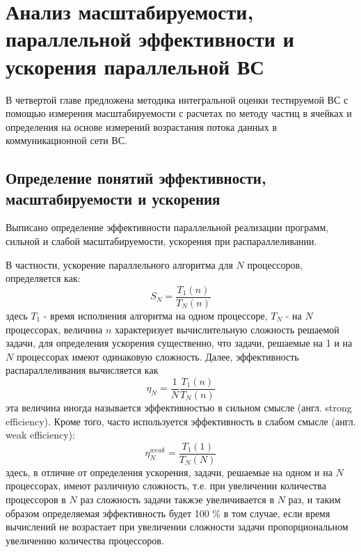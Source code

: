 \chapter{Анализ масштабируемости, параллельной эффективности и ускорения параллельной ВС}
				В четвертой главе предложена методика интегральной оценки тестируемой ВС с помощью измерения масштабируемости с расчетах по методу частиц в ячейках и определения на основе измерений возрастания потока данных в коммуникационной сети ВС.
							
			\section{Определение понятий эффективности, масштабируемости и ускорения}
			
			Выписано определение эффективности параллельной реализации программ, сильной и слабой масштабируемости, ускорения при распараллеливании.
			
			В частности, ускорение параллельного алгоритма для $N$ процессоров, определяется как:
			$$
			S_N = \frac{T_1(n)}{T_N(n)}
			$$  
			здесь $T_1$ - время исполнения алгоритма на одном процессоре, $T_N$ - на $N$ процессорах, величина $n$ характеризует вычислительную сложность решаемой задачи, для определения ускорения существенно, что задачи, решаемые на 1 и на $N$ процессорах имеют одинаковую сложность.
			Далее, эффективность распараллеливания вычисляется как
			$$
			\eta_N = \frac{1}{N}\frac{T_1(n)}{T_N(n)}
			$$  
			эта величина иногда называется эффективностью в сильном смысле (англ. strong efficiency). Кроме того, часто используется эффективность в слабом смысле (англ. weak efficiency):
			\begin{equation}
			\label{weak_eff}
			\eta^{weak}_N = \frac{T_1(1)}{T_N(N)}
			\end{equation}
			здесь, в отличие от определения ускорения, задачи, решаемые на одном и на $N$ процессорах, имеют различную сложность, т.е. при увеличении количества процессоров в $N$ раз сложность задачи такжэе увеличивается в $N$ раз, и таким образом определяемая эффективность будет 100 \% в том случае, если время вычислений не возрастает при увеличении сложности задачи пропорциональном увеличению количества процессоров.   
			
